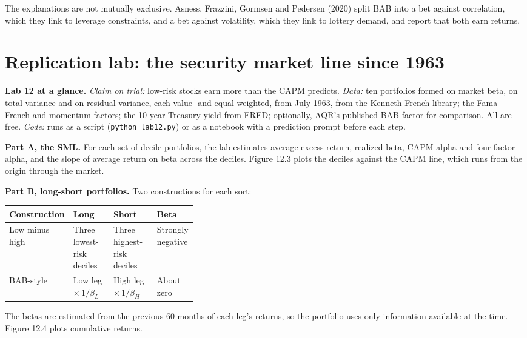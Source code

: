 The explanations are not mutually exclusive. Asness, Frazzini, Gormsen and Pedersen (2020) split BAB into a bet against correlation, which they link to leverage constraints, and a bet against volatility, which they link to lottery demand, and report that both earn returns.

\section{Replication lab: the security market line since 1963}
\label{sec:12-lab}

\begin{callout}
\textbf{Lab 12 at a glance.} \emph{Claim on trial:} low-risk stocks earn more than the CAPM predicts. \emph{Data:} ten portfolios formed on market beta, on total variance and on residual variance, each value- and equal-weighted, from July 1963, from the Kenneth French library; the Fama--French and momentum factors; the 10-year Treasury yield from FRED; optionally, AQR's published BAB factor for comparison. All are free. \emph{Code:} runs as a script (\texttt{python lab12.py}) or as a notebook with a prediction prompt before each step.
\end{callout}

\textbf{Part A, the SML.} For each set of decile portfolios, the lab estimates average excess return, realized beta, CAPM alpha and four-factor alpha, and the slope of average return on beta across the deciles. Figure 12.3 plots the deciles against the CAPM line, which runs from the origin through the market.

\textbf{Part B, long-short portfolios.} Two constructions for each sort:

\begin{center}
\small
\begin{tabularx}{0.9\linewidth}{@{}>{\raggedright\arraybackslash}p{0.19\linewidth}>{\raggedright\arraybackslash}X>{\raggedright\arraybackslash}X>{\raggedright\arraybackslash}p{0.17\linewidth}@{}}
\toprule
Construction & Long & Short & Beta \\
\midrule
Low minus high & Three lowest-risk deciles & Three highest-risk deciles & Strongly negative \\
BAB-style & Low leg $\times\, 1/\beta_L$ & High leg $\times\, 1/\beta_H$ & About zero \\
\bottomrule
\end{tabularx}
\end{center}

The betas are estimated from the previous 60 months of each leg's returns, so the portfolio uses only information available at the time. Figure 12.4 plots cumulative returns.


